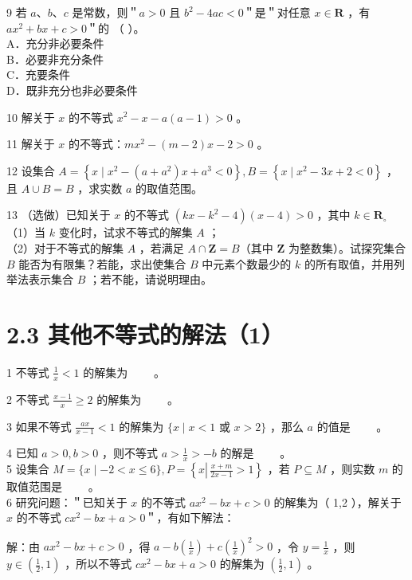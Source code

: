 \documentclass[10pt]{article}
\begin{document}
9 若 \(a 、 b 、 c\) 是常数，则＂\(a>0\) 且 \(b^{2}-4 a c<0\)＂是＂对任意 \(x \in \mathbf{R}\) ，有 \(a x^{2}+b x+c>0\)＂的 （ ）。\\
A．充分非必要条件\\
B．必要非充分条件\\
C．充要条件\\
D．既非充分也非必要条件

10 解关于 \(x\) 的不等式 \(x^{2}-x-a(a-1)>0\) 。

11 解关于 \(x\) 的不等式：\(m x^{2}-(m-2) x-2>0\) 。

12 设集合 \(A=\left\{x \mid x^{2}-\left(a+a^{2}\right) x+a^{3}<0\right\}, B=\left\{x \mid x^{2}-3 x+2<0\right\}\) ，且 \(A \cup B=B\) ，求实数 \(a\) 的取值范围。

13 （选做）已知关于 \(x\) 的不等式 \(\left(k x-k^{2}-4\right)(x-4)>0\) ，其中 \(k \in \mathbf{R}_{\circ}\)\\
（1）当 \(k\) 变化时，试求不等式的解集 \(A\) ；\\
（2）对于不等式的解集 \(A\) ，若满足 \(A \cap \mathbf{Z}=B\)（其中 \(\mathbf{Z}\) 为整数集）。试探究集合 \(B\) 能否为有限集？若能，求出使集合 \(B\) 中元素个数最少的 \(k\) 的所有取值，并用列举法表示集合 \(B\) ；若不能，请说明理由。

\section*{2.3 其他不等式的解法（1）}
1 不等式 \(\frac{1}{x}<1\) 的解集为 \(\qquad\)。

2 不等式 \(\frac{x-1}{x} \geqslant 2\) 的解集为 \(\qquad\)。

3 如果不等式 \(\frac{a x}{x-1}<1\) 的解集为 \(\{x \mid x<1\) 或 \(x>2\}\) ，那么 \(a\) 的值是 \(\qquad\)。

4 已知 \(a>0, b>0\) ，则不等式 \(a>\frac{1}{x}>-b\) 的解是 \(\qquad\)。\\
5 设集合 \(M=\{x \mid-2<x \leqslant 6\}, P=\left\{x \left\lvert\, \frac{x+m}{2 x-1}>1\right.\right\}\) ，若 \(P \subseteq M\) ，则实数 \(m\) 的取值范围是 \(\qquad\)。\\
6 研究问题：＂已知关于 \(x\) 的不等式 \(a x^{2}-b x+c>0\) 的解集为（ 1,2 ），解关于 \(x\) 的不等式 \(c x^{2}-b x+a>0\)＂，有如下解法：

解：由 \(a x^{2}-b x+c>0\) ，得 \(a-b\left(\frac{1}{x}\right)+c\left(\frac{1}{x}\right)^{2}>0\) ，令 \(y=\frac{1}{x}\) ，则 \(y \in\left(\frac{1}{2}, 1\right)\) ，所以不等式 \(c x^{2}-b x+a>0\) 的解集为 \(\left(\frac{1}{2}, 1\right)\) 。
\end{document}
